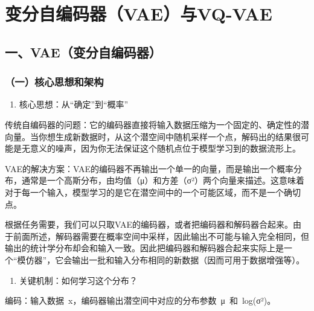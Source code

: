\clearpage

\hypertarget{ux53d8ux5206ux81eaux7f16ux7801ux5668vaeux4e0evq-vae}{%
\section{变分自编码器（VAE）与VQ-VAE}\label{ux53d8ux5206ux81eaux7f16ux7801ux5668vaeux4e0evq-vae}}

\hypertarget{ux4e00vaeux53d8ux5206ux81eaux7f16ux7801ux5668}{%
\subsection{一、VAE（变分自编码器）}\label{ux4e00vaeux53d8ux5206ux81eaux7f16ux7801ux5668}}

\hypertarget{ux4e00ux6838ux5fc3ux601dux60f3ux548cux67b6ux6784}{%
\subsubsection{（一）核心思想和架构}\label{ux4e00ux6838ux5fc3ux601dux60f3ux548cux67b6ux6784}}

\begin{enumerate}
\def\labelenumi{\arabic{enumi}.}
\tightlist
\item
  核心思想：从``确定''到``概率''
\end{enumerate}

传统自编码器的问题：它的编码器直接将输入数据压缩为一个固定的、确定性的潜向量。当你想生成新数据时，从这个潜空间中随机采样一个点，解码出的结果很可能是无意义的噪声，因为你无法保证这个随机点位于模型学习到的数据流形上。

VAE的解决方案：VAE的编码器不再输出一个单一的向量，而是输出一个概率分布，通常是一个高斯分布，由均值（μ）和方差（σ²）两个向量来描述。这意味着对于每一个输入，模型学习的是它在潜空间中的一个可能区域，而不是一个确切点。

根据任务需要，我们可以只取VAE的编码器，或者把编码器和解码器合起来。由于前面所述，解码器需要在概率空间中采样，因此输出不可能与输入完全相同，但输出的统计学分布却会和输入一致。因此把编码器和解码器合起来实际上是一个``模仿器''，它会输出一批和输入分布相同的新数据（因而可用于数据增强等）。

\begin{enumerate}
\def\labelenumi{\arabic{enumi}.}
\setcounter{enumi}{1}
\tightlist
\item
  关键机制：如何学习这个分布？
\end{enumerate}

编码：输入数据~x，编码器输出潜空间中对应的分布参数~μ~和~log(σ²)。


